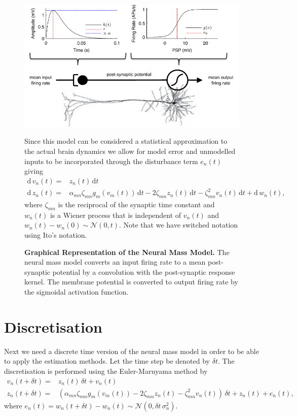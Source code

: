 \documentclass[]{article}
\begin{document}
\begin{figure}[ht]
	\centering
		\includegraphics[scale=1]{./Figures/pdf/StandardNeuralMass.pdf}
	\caption{\textbf{Graphical Representation of the Neural Mass Model.} The neural mass model converts an input firing rate to a mean post-synaptic potential by a convolution with the post-synaptic response kernel. The membrane potential is converted to output firing rate by the sigmoidal activation function.} 

Since this model can be considered a statistical approximation to the actual brain dynamics we allow for model error and unmodelled inputs to be incorporated through the disturbance term $e_n(t)$ giving
\begin{align}
	\mathrm{d}\, v_n(t) =& z_n(t)\,\mathrm{d}t \\
	\mathrm{d}\, z_n(t) =& \alpha_{mn}\zeta_{mn} g_m(v_m(t))\,\mathrm{d}t - 2\zeta_{mn}z_n(t)\,\mathrm{d}t - \zeta^2_{mn} v_n(t)\,\mathrm{d}t + \mathrm{d}\,w_n(t),
\end{align}
where $\zeta_{mn}$ is the reciprocal of the synaptic time constant and $w_n(t)$ is a Wiener process that is independent of $v_n(t)$ and $w_n(t) - w_n(0) \sim \mathcal{N}(0,t)$. Note that we have switched notation using Ito's notation.


	\label{fig:StandardNeuralMass}
\end{figure}

\section{Discretisation}
Next we need a discrete time version of the neural mass model in order to be able to apply the estimation methods. Let the time step be denoted by $\delta t$. The discretisation is performed using the Euler-Maruyama method by
\begin{align}
	v_n(t+\delta t) = & z_n(t)\,\delta t + v_n(t) \\
	z_n(t+\delta t) =& \left(\alpha_{mn}\zeta_{mn} g_m(v_m(t)) - 2\zeta_{mn}z_n(t) - \zeta^2_{mn} v_n(t)\right)\,\delta t + z_n(t) + e_n(t),
\end{align}
where $e_n(t) = w_n(t + \delta t) - w_n(t) \sim \mathcal{N}(0,\delta t \,\sigma_n^2)$.
\end{document}
